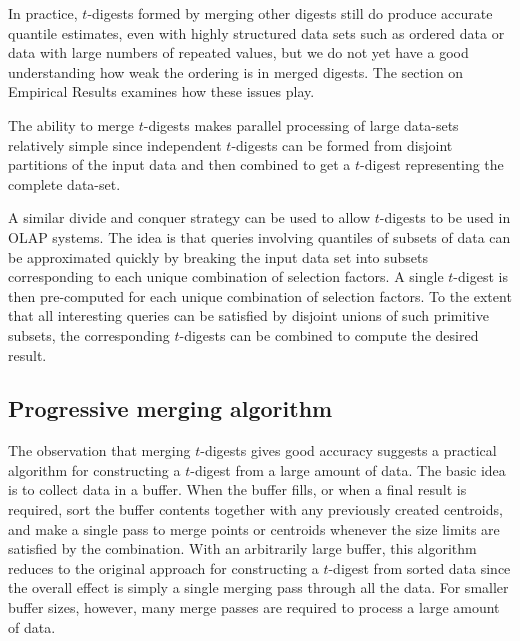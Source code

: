 \documentclass[]{statsoc}
\begin{document}
In practice, $t$-digests formed by merging other digests still do produce accurate quantile estimates, even with highly structured data sets such as ordered data or data with large numbers of repeated values, but we do not yet have a good understanding how weak the ordering is in merged digests. The section on Empirical Results examines how these issues play.

The ability to merge $t$-digests makes parallel processing of large data-sets relatively simple since independent $t$-digests can be formed from disjoint partitions of the input data and then combined to get a $t$-digest representing the complete data-set.

A similar divide and conquer strategy can be used to allow $t$-digests to be used in OLAP systems. The idea is that queries involving quantiles of subsets of data can be approximated quickly by breaking the input data set into subsets corresponding to each unique combination of selection factors. A single $t$-digest is then pre-computed for each unique combination of selection factors. To the extent that all interesting queries can be satisfied by disjoint unions of such primitive subsets, the corresponding $t$-digests can be combined to compute the desired result.

\subsection{Progressive merging algorithm}
The observation that merging $t$-digests gives good accuracy suggests a practical algorithm for constructing a $t$-digest from a large amount of data. The basic idea is to collect data in a buffer. When the buffer fills, or when a final result is required, sort the buffer contents together with any previously created centroids, and make a single pass to merge points or centroids  whenever the size limits are satisfied by the combination. With an arbitrarily large buffer, this algorithm reduces to the original approach for constructing a $t$-digest from sorted data since the overall effect is simply a single merging pass through all the data. For smaller buffer sizes, however, many merge passes are required to process a large amount of data. 
\end{document}
